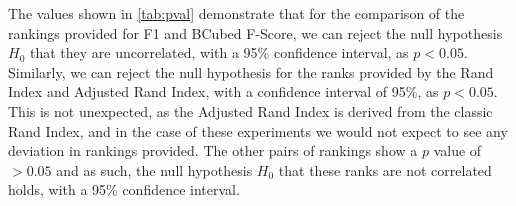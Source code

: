 \documentclass[../main.tex]{subfiles}
\begin{document}
The values shown in \autoref{tab:pval} demonstrate that for the comparison of the rankings provided for F1 and BCubed F-Score, we can reject the null hypothesis $H_0$ that they are uncorrelated, with a 95\% confidence interval, as $p < 0.05$. Similarly, we can reject the null hypothesis for the ranks provided by the Rand Index and Adjusted Rand Index, with a confidence interval of 95\%, as $p < 0.05$. This is not unexpected, as the Adjusted Rand Index is derived from the classic Rand Index, and in the case of these experiments we would not expect to see any deviation in rankings provided. The other pairs of rankings show a $p$ value of $> 0.05$ and as such, the null hypothesis $H_0$ that these ranks are not correlated holds, with a 95\% confidence interval.
\end{document}
